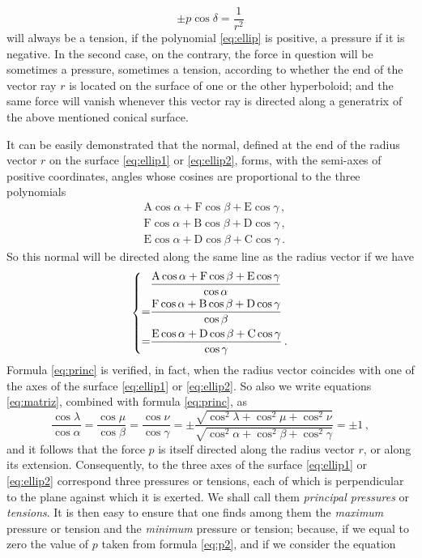 \documentclass[leqno,openright,smallroyalvopaper,8pt,twoside,showtrims]{memoir}
\begin{document}
\begin{equation}
 \pm p\cos\delta = \dfrac{1}{r^2}
 \end{equation}
 will always be a tension, if the polynomial \eqref{eq:ellip} is positive, a pressure if it is negative. In the second case, on the contrary, the force in question will be sometimes a pressure, sometimes a tension, according to whether the end of the vector ray $r$ is located on the surface of one or the other hyperboloid; and the same force will vanish whenever this vector ray is directed along a generatrix of the above mentioned conical surface.

It can be easily demonstrated that the normal, defined at the end of the radius vector $r$ on the surface \eqref{eq:ellip1} or \eqref{eq:ellip2}, forms, with the semi-axes of positive coordinates, angles whose cosines are proportional to the three polynomials
\begin{align*}
&\text{A}\cos\alpha+\text{F}\cos\beta+\text{E}\cos\gamma\,,\\
&\text{F}\cos\alpha+\text{B}\cos\beta+\text{D}\cos\gamma\,,\\ 
&\text{E}\cos\alpha+\text{D}\cos\beta+\text{C}\cos\gamma\,.
\end{align*}
So this normal will be directed along the same line as the radius vector if we have
\begin{equation}\label{eq:princ}
\begin{dcases}
\begin{aligned}
&\dfrac{\text{A}\cos\alpha+\text{F}\cos\beta+\text{E}\cos\gamma}{\cos\alpha}\\
=&\dfrac{\text{F}\cos\alpha+\text{B}\cos\beta+\text{D}\cos\gamma}{\cos\beta}\\
=&\dfrac{\text{E}\cos\alpha+\text{D}\cos\beta+\text{C}\cos\gamma}{\cos\gamma}\,.
\end{aligned}
\end{dcases}
\end{equation}
Formula \eqref{eq:princ} is verified, in fact, when the radius vector coincides with one of the axes of the surface \eqref{eq:ellip1} or \eqref{eq:ellip2}. So also we write equations \eqref{eq:matriz}, combined with formula \eqref{eq:princ}, as
\begin{equation}\label{eq:princ1}
\dfrac{\cos\lambda}{\cos\alpha}=\dfrac{\cos\mu}{\cos\beta}=\dfrac{\cos\nu}{\cos\gamma}=\pm\dfrac{\sqrt{\cos^2\lambda+\cos^2\mu+\cos^2\nu}}{\sqrt{\cos^2\alpha+\cos^2\beta+\cos^2\gamma}}=\pm 1\,,
\end{equation}
and it follows that the force $p$ is itself directed along the radius vector $r$, or along its extension. Consequently, to the three axes of the surface \eqref{eq:ellip1} or \eqref{eq:ellip2} correspond three pressures or tensions, each of which is perpendicular to the plane against which it is exerted. We shall call them \emph{principal pressures} or \emph{tensions}. It is then easy to ensure that one finds among them the \emph{maximum} pressure or tension and the \emph{minimum} pressure or tension; because, if we equal to zero the value of $p$ taken from formula \eqref{eq:p2}, and if we consider the equation
\end{document}
